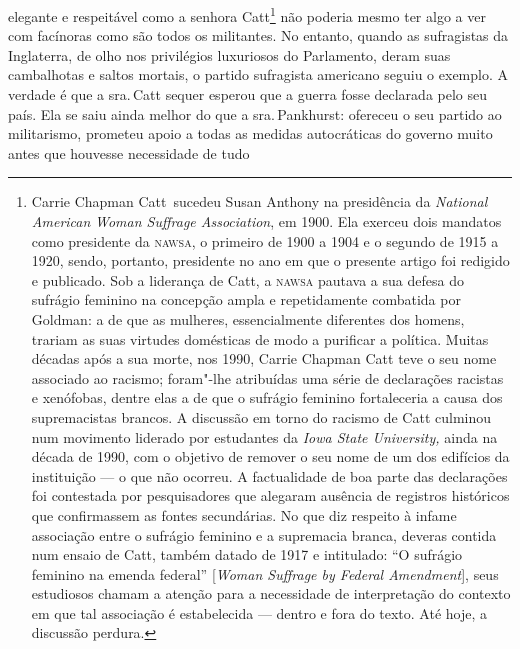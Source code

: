 elegante e respeitável como a senhora Catt\footnote{Carrie Chapman
  Catt~sucedeu Susan Anthony na presidência da \emph{National American}
  \emph{Woman Suffrage Association}, em 1900. Ela exerceu dois mandatos
  como presidente da \textsc{nawsa}, o primeiro de 1900 a 1904 e o segundo de
  1915 a 1920, sendo, portanto, presidente no ano em que o presente
  artigo foi redigido e publicado. Sob a liderança de Catt, a \textsc{nawsa}
  pautava a sua defesa do sufrágio feminino na concepção ampla e
  repetidamente combatida por Goldman: a de que as mulheres,
  essencialmente diferentes dos homens, trariam as suas virtudes
  domésticas de modo a purificar a política. Muitas décadas após a sua
  morte, nos 1990, Carrie Chapman Catt teve o seu nome associado ao
  racismo; foram"-lhe atribuídas uma série de declarações racistas e
  xenófobas, dentre elas a de que o sufrágio feminino fortaleceria a
  causa dos supremacistas brancos. A discussão em torno do racismo de
  Catt culminou num movimento liderado por estudantes da \emph{Iowa
  State University,} ainda na década de 1990, com o objetivo de remover
  o seu nome de um dos edifícios da instituição --- o que não ocorreu. A
  factualidade de boa parte das declarações foi contestada por
  pesquisadores que alegaram ausência de registros históricos que
  confirmassem as fontes secundárias. No que diz respeito à infame
  associação entre o sufrágio feminino e a supremacia branca, deveras
  contida num ensaio de Catt, também datado de 1917 e intitulado: ``O
  sufrágio feminino na emenda federal'' {[}\emph{Woman Suffrage by
  Federal Amendment}{]}, seus estudiosos chamam a atenção para a
  necessidade de interpretação do contexto em que tal associação é
  estabelecida --- dentro e fora do texto. Até hoje, a discussão perdura.}
não poderia mesmo ter algo a ver com facínoras como são todos os
militantes. No entanto, quando as sufragistas da Inglaterra, de olho nos
privilégios luxuriosos do Parlamento, deram suas cambalhotas e saltos
mortais, o partido sufragista americano seguiu o exemplo. A verdade é
que a sra.\,Catt sequer esperou que a guerra fosse declarada pelo seu
país. Ela se saiu ainda melhor do que a sra.\,Pankhurst: ofereceu o seu
partido ao militarismo, prometeu apoio a todas as medidas autocráticas
do governo muito antes que houvesse necessidade de tudo
